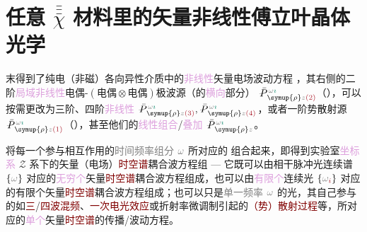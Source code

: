 
\chapter{任意 \texorpdfstring{$\bar{\bar{\bar{\chi}}}$}{$\bar{\bar{\bar{\text{χ}}}}$} 材料里的矢量非线性傅立叶晶体光学}\label{chap:NFCO}

 末得到了\textcolor{PineGreen}{纯电（非磁）各向异性}介质中的\textcolor{Plum}{非线性}矢量电场波动方程 ，其右侧的二阶\textcolor{Plum}{局域}\textcolor{Plum}{非线性}\textcolor{NavyBlue}{电偶-$(\text{电偶}\otimes\text{电偶})$}极\textcolor{NavyBlue}{波源}（的\textcolor{Plum}{横向}部分） $\Xint{\mathcolor{gray}{-}}{25}{\bar{P}}^{\;\! \mathcolor{gray}{\omega} \textcolor{PineGreen}{\imath}}_{\;\! \symup{\rho} \mathcolor{gray}{z} \textcolor{Maroon}{(2)}}$（），可以按需更改为三阶、四阶\textcolor{Plum}{非线性} $\Xint{\mathcolor{gray}{-}}{25}{\bar{P}}^{\;\! \mathcolor{gray}{\omega} \textcolor{PineGreen}{\imath}}_{\;\! \symup{\rho} \mathcolor{gray}{z} \textcolor{Maroon}{(3)}}, \Xint{\mathcolor{gray}{-}}{25}{\bar{P}}^{\;\! \mathcolor{gray}{\omega} \textcolor{PineGreen}{\imath}}_{\;\! \symup{\rho} \mathcolor{gray}{z} \textcolor{Maroon}{(4)}}$，或者一阶\textcolor{NavyBlue}{势散射}源 $\Xint{\mathcolor{gray}{-}}{25}{\bar{P}}^{\;\! \mathcolor{gray}{\omega} \textcolor{PineGreen}{\imath}}_{\;\! \symup{\rho} \mathcolor{gray}{z} \textcolor{Maroon}{(1)}}$（），甚至他们的\textcolor{Plum}{线性组合}/\textcolor{Plum}{叠加} $\Xint{\mathcolor{gray}{-}}{25}{\bar{P}}^{\;\! \mathcolor{gray}{\omega} \textcolor{PineGreen}{\imath}}_{\;\! \symup{\rho} \mathcolor{gray}{z}}$。

将每一个参与相互作用的\textcolor{gray}{时间频率组分} $\mathcolor{gray}{\omega}$ 所对应的  组合起来，即得到\textcolor{PineGreen}{实验室}\textcolor{Plum}{坐标系} \textcolor{PineGreen}{$\mathcal{Z}$ 系}下的矢量（电场）\textcolor{Maroon}{时空谱}耦合波方程组 --- 它既可以由相干\textcolor{NavyBlue}{脉冲光连续谱} $\left\{ \mathcolor{gray}{\omega} \right\}$ 对应的\textcolor{Plum}{无穷个}矢量\textcolor{Maroon}{时空谱}耦合波方程组成，也可以由\textcolor{Plum}{有限个}\textcolor{NavyBlue}{连续光} $\left\{ \mathcolor{gray}{\omega}_{\textcolor{Maroon}{i}} \right\}$ 对应的有限个矢量\textcolor{Maroon}{时空谱}耦合波方程组成；也可以只是\textcolor{gray}{单一频率} $\mathcolor{gray}{\omega}$ 的光，其自己参与的如\textcolor{Maroon}{三}/\textcolor{Maroon}{四波混频}、\textcolor{Maroon}{一次电光效应}或\textcolor{PineGreen}{折射率微调制}引起的\textcolor{Maroon}{（势）散射过程}等，所对应的\textcolor{Plum}{单个}矢量\textcolor{Maroon}{时空谱}的传播/波动方程。

